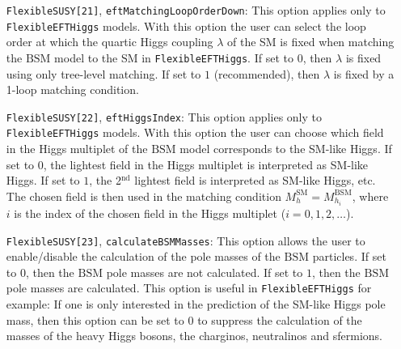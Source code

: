 \documentclass[final,3p,11pt,pdflatex]{elsarticle}
\makeatletter
\newcommand{\feft}{\texttt{Flex\-ib\-le\-EFT\-Higgs}\@\xspace}
\newcommand{\SM}{\ensuremath{\text{SM}}\xspace}
\newcommand{\BSM}{\ensuremath{\text{BSM}}\xspace}
\makeatother
\begin{document}
\begin{itemize}
\item[\texttt{FlexibleSUSY[21]},] \texttt{eftMatchingLoopOrderDown}:
  This option applies only to \feft models.  With this option the user
  can select the loop order at which the quartic Higgs coupling
  $\lambda$ of the SM is fixed when matching the \BSM
  model to the SM in \feft.  If set to $0$, then $\lambda$
  is fixed using only tree-level matching.  If set to $1$
  (recommended), then $\lambda$ is fixed by a 1-loop matching
  condition.

\item[\texttt{FlexibleSUSY[22]},] \texttt{eftHiggsIndex}: This option
  applies only to \feft models.  With this option the user can choose
  which field in the Higgs multiplet of the \BSM model corresponds to
  the SM-like Higgs.  If set to $0$, the lightest field in the Higgs
  multiplet is interpreted as SM-like Higgs.  If set to $1$, the
  2$^{\text{nd}}$ lightest field is interpreted as SM-like Higgs, etc.
  The chosen field is then used in the matching condition
  $M_h^{\SM} = M_{h_i}^{\BSM}$, where $i$ is the index of the chosen
  field in the Higgs multiplet ($i=0,1,2,\ldots$).

\item[\texttt{FlexibleSUSY[23]},] \texttt{calculateBSMMasses}: This
  option allows the user to enable/disable the calculation of the pole
  masses of the \BSM particles.  If set to $0$, then the \BSM pole
  masses are not calculated.  If set to $1$, then the \BSM pole masses
  are calculated.  This option is useful in \feft for example: If one
  is only interested in the prediction of the SM-like Higgs pole mass,
  then this option can be set to $0$ to suppress the calculation of
  the masses of the heavy Higgs bosons, the charginos, neutralinos and sfermions.


\end{itemize}
\end{document}
